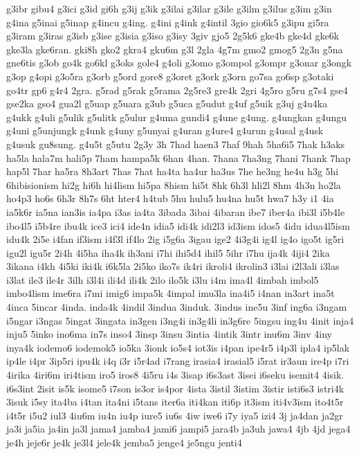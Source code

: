 g3ibr
gibu4
g3ici
g3id
gi6h
g3ij
g3ik
g3ilai
g3ilar
g3ile
g3ilm
g3ilus
g3im
g3in
g4ina
g5inai
g5inap
g4incu
g4ing.
g4ini
g4ink
g4intil
3gio
gio6k5
g3ipu
gi5ra
g3iram
g3iras
g3isb
g3ise
g3isia
g3iso
g3isy
3giv
gjo5
2g5k6
gke4b
gke4d
gke6k
gke3la
gke6ran.
gki8h
gko2
gkra4
gku6m
g3l
2gla
4g7m
gmo2
gmog5
2g3n
g5na
gne6tis
g3ob
go4k
go6kl
g3oks
gole4
g4oli
g3omo
g3ompol
g3ompr
g3onar
g3ongk
g3op
g4opi
g3o5ra
g3orb
g5ord
gore8
g3oret
g3ork
g3orn
go7sa
go6sp
g3otaki
go4tr
gp6
g4r4
2gra.
g5rad
g5rak
g5rama
2g5re3
gre4k
2gri
4g5ro
g5ru
g7s4
gse4
gse2ka
gso4
gua2l
g5uap
g5uara
g3ub
g5uca
g5udut
g4uf
g5uik
g3uj
g4u4ka
g4ukk
g4uli
g5ulik
g5ulitk
g5ulur
g4uma
gundi4
g4une
g4ung.
g4ungkan
g4ungu
g4uni
g5unjungk
g4unk
g4uny
g5unyai
g4uran
g4ure4
g4urun
g4usal
g4usk
g4usuk
gu8sung.
g4u5t
g5utu
2g3y
3h
7had
haen3
7haf
9hah
5ha6i5
7hak
h3aks
ha5la
hala7m
hali5p
7ham
hampa5k
6han
4han.
7hana
7ha3ng
7hani
7hank
7hap
hap5l
7har
ha5ra
8h3art
7has
7hat
ha4ta
ha4ur
ha3us
7he
he3ng
he4u
h3g
5hi
6hibisionism
hi2g
hi6h
hi4lism
hi5pa
8hism
hi5t
8hk
6h3l
hli2l
8hm
4h3n
ho2la
ho4p3
ho6s
6h3r
8h7s
6ht
hter4
h4tub
5hu
hulu5
hu4na
hu5t
hwa7
h3y
i1
4ia
ia5k6r
ia5na
ian3is
ia4pa
i3as
ia4ta
3ibada
3ibai
4ibaran
ibe7
iber4a
ibi3l
i5b4le
ibo4l5
i5b4re
ibu4k
ice3
ici4
ide4n
idia5
idi4k
idi2l3
id3ism
idos5
4idu
idua4l5ism
idu4k
2i5e
i4fan
if3ism
i4f3l
if4lo
2ig
i5g6a
3igau
ige2
4i3g4i
ig4l
ig4o
igo5t
ig5ri
igu2l
igu5r
2i4h
4i5ha
iha4k
ih3ani
i7hi
ihi5d4
ihil5
5ihr
i7hu
ija4k
4iji4
2ika
3ikana
i4kh
4i5ki
iki4k
i6k5la
2i5ko
iko7s
ik4ri
ikroli4
ikrolin3
i3lai
i2l3ali
i3las
i3lat
ile3
ile4r
3ilh
i3l4i
ili4d
ili4k
2ilo
ilo5k
i3lu
i4m
ima4l
4imbah
imbol5
imbo4lism
ime6ra
i7mi
imig6
impa5k
4impal
imu3la
ina4i5
i4nan
in3art
ina5t
4inca
5incar
4inda.
inda4k
4indil
3indua
3induk.
3indus
ine5u
3inf
ing6a
i3ngam
i5ngar
i3ngas
5ingat
3ingata
in3gen
i3ng4i
in3g4li
in3g6re
5ingsu
ing4u
4init
inja4
inju5
5inko
ino6ma
in7s
inso4
3insp
3insu
3intia
4intik
3intr
inu6m
3inv
4iny
inya4k
iodemo6
iodemok5
io5ka
3ionk
io5s4
iot3is
i4pan
ipe4r5
i4p3l
ipla4
ip5lak
ip4le
i4pr
3ip5ri
ipu4k
i4q
i3r
i5r4ad
i7rang
irasia4
irasial5
i5rat
ir3aun
ire4p
i7ri
4irika
4iri6m
iri4tism
iro5
iros8
4i5ru
i4s
3isap
i6s3ast
3isei
i6seku
isemit4
4isik.
i6s3int
2isit
is5k
isome5
i7son
is3or
is4por
4ista
3istil
3istim
3istir
isti6s3
istri4k
3isuk
i5sy
ita4ba
i4tan
ita4ni
i5tans
iter6a
iti4kan
iti6p
it3ism
iti4v3ism
ito4t5r
i4t5r
i5u2
iul3
4iu6m
iu4n
iu4p
iure5
iu6s
4iw
iwe6
i7y
iya5
izi4
3j
ja4dan
ja2gr
ja3i
ja5ia
ja4in
ja3l
jama4
jamba4
jami6
jampi5
jara4b
ja3uh
jawa4
4jb
4jd
jega4
je4h
jeje6r
je4k
je3l4
jele4k
jemba5
jenge4
je5ngu
jenti4
